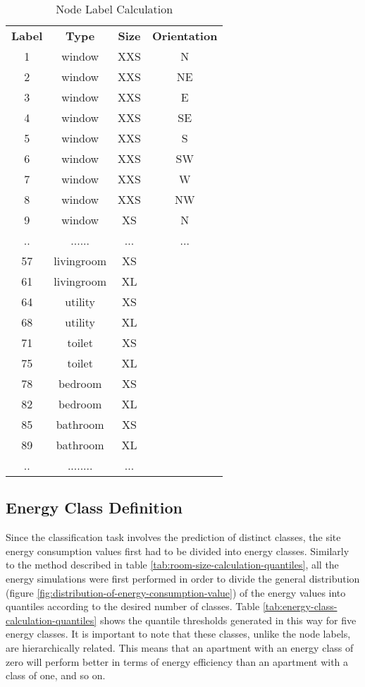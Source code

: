 \documentclass[a4paper, 12pt]{report}
\begin{document}
\begin{table}
\centering
\begin{tabular}{ cccc }
\textbf{Label} & \textbf{Type} & \textbf{Size} & \textbf{Orientation} \\
1 & window & XXS & N \\
2 & window & XXS & NE \\
3 & window & XXS & E \\
4 & window & XXS & SE \\
5 & window & XXS & S \\
6 & window & XXS & SW \\
7 & window & XXS & W \\
8 & window & XXS & NW \\
9 & window & XS & N \\
.. & ...... & ... & ... \\
57 & livingroom & XS & \\
61 & livingroom & XL & \\
64 & utility & XS & \\
68 & utility & XL & \\
71 & toilet & XS & \\
75 & toilet & XL & \\
78 & bedroom & XS & \\
82 & bedroom & XL & \\
85 & bathroom & XS & \\
89 & bathroom & XL & \\
.. & ........ & ... & \\
\end{tabular}
\caption{Node Label Calculation}
\label{tab:node-label-calculation}
\end{table}

\subsection{Energy Class Definition}\label{subsec:energy-class-definition}

Since the classification task involves the prediction of distinct classes, the \gls{site energy consumption} values first had to be divided into energy classes. Similarly to the method described in table \ref{tab:room-size-calculation-quantiles}, all the energy simulations were first performed in order to divide the general distribution (figure \ref{fig:distribution-of-energy-consumption-value}) of the energy values into \glspl{quantile} according to the desired number of classes. Table \ref{tab:energy-class-calculation-quantiles} shows the \gls{quantile} thresholds generated in this way for five energy classes. It is important to note that these classes, unlike the node labels, are hierarchically related. This means that an apartment with an energy class of zero will perform better in terms of energy efficiency than an apartment with a class of one, and so on.
\end{document}
